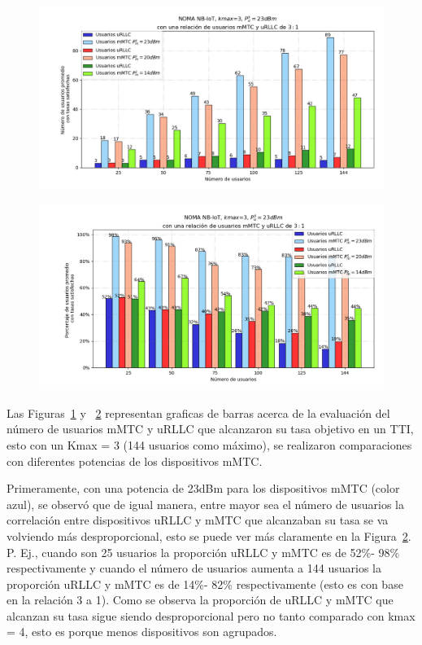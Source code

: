 \begin{figure}[th]
    \centering
    \includegraphics[scale=.6]{Figures/ResultadosNOMA/Kmax3_DiferentesPM.png}
    \decoRule
    \caption[]{}
    \label{fig:Kmax3_DiferentesPM}
\end{figure}

\begin{figure}[th]
    \centering
    \includegraphics[scale=.6]{Figures/ResultadosNOMA/Kmax3_DiferentesPM_Porcentual.png}
    \decoRule
    \caption[]{}
    \label{fig:Kmax3_DiferentesPM_Porcentual}
\end{figure}


Las Figuras~\ref{fig:Kmax3_DiferentesPM} y ~\ref{fig:Kmax3_DiferentesPM_Porcentual} representan graficas de barras acerca de la evaluación del número de usuarios mMTC y uRLLC que alcanzaron su tasa objetivo en un TTI, esto con un Kmax = 3 (144 usuarios como máximo), se realizaron comparaciones con diferentes potencias de los dispositivos mMTC.

Primeramente, con una potencia de 23dBm para los dispositivos mMTC (color azul), se observó que de igual manera, entre mayor sea el número de usuarios la correlación entre dispositivos uRLLC y mMTC que alcanzaban su tasa se va volviendo más desproporcional, esto se puede ver más claramente en la Figura~\ref{fig:Kmax3_DiferentesPM_Porcentual}. P. Ej., cuando son 25 usuarios la proporción uRLLC y mMTC es de 52\%- 98\% respectivamente y cuando el número de usuarios aumenta a 144 usuarios la proporción uRLLC y mMTC es de 14\%- 82\% respectivamente (esto es con base en la relación 3 a 1). Como se observa la proporción de uRLLC y mMTC que alcanzan su tasa sigue siendo desproporcional pero no tanto comparado con kmax = 4, esto es porque menos dispositivos son agrupados.\newline

